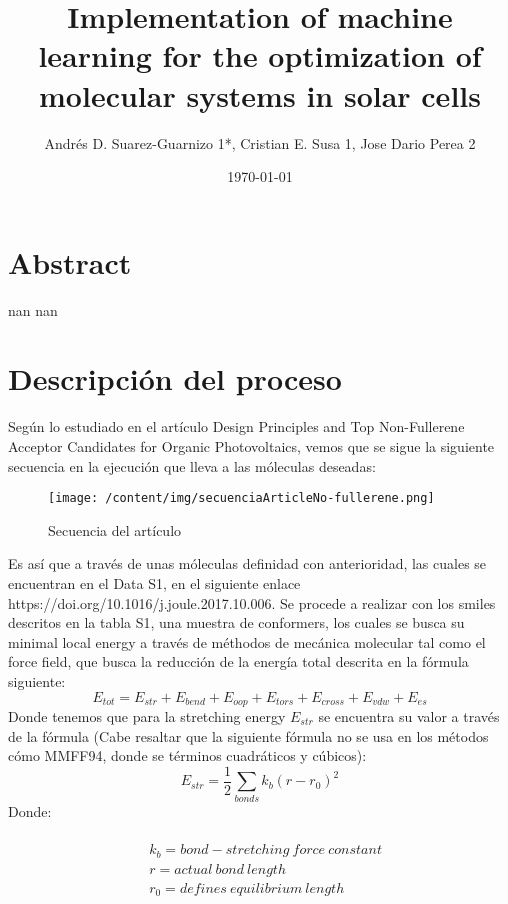 \documentclass{article}%
\title{Implementation of machine learning for the optimization of molecular systems in solar cells}%
\author{Andrés D. Suarez{-}Guarnizo 1*, Cristian E. Susa 1, Jose Dario Perea 2}%
\date{\today}%
\begin{document}
%
\normalsize%
\maketitle%
\section{Abstract}%
\label{sec:Abstract}%
nan%
nan

%
\section{Descripción del proceso}%
\label{sec:Descripcindelproceso}%
Según lo estudiado en el artículo Design Principles and Top Non{-}Fullerene Acceptor Candidates for Organic Photovoltaics, vemos que se sigue la siguiente secuencia en la ejecución que lleva a las móleculas deseadas:%


\begin{figure}[h!]%
\centering%
\texttt{[image: /content/img/secuenciaArticleNo-fullerene.png]}%
\caption{Secuencia del artículo}%
\end{figure}

%
Es así que a través de unas móleculas definidad con anterioridad, las cuales se encuentran en el Data S1, en el siguiente enlace https://doi.org/10.1016/j.joule.2017.10.006. Se procede a realizar con los smiles descritos en la tabla S1, una muestra de conformers, los cuales se busca su minimal local energy a través de méthodos de mecánica molecular tal como el force field, que busca la reducción de la energía total descrita en la fórmula siguiente:%
\begin{equation}
    E_{tot} = E_{str} + E_{bend} + E_{oop} + E_{tors} + E_{cross} + E_{vdw} + E_{es} 
\end{equation}%
Donde tenemos que para la stretching energy $E_{str}$ se encuentra su valor a través de la fórmula (Cabe resaltar que la siguiente fórmula no se usa en los métodos cómo MMFF94, donde se términos cuadráticos y cúbicos):%
\begin{equation}
    E_{str} = \frac{1}{2} \sum_{bonds} k_b(r-r_0)^2%
\end{equation}%
Donde:
\begin{fleqn}
\begin{equation*}
\begin{alignedat}{2}
\\ &k_b = bond-stretching \ force \ constant \\  
&r = actual\ bond\ length \\ 
&r_0 = defines\ equilibrium\ length\\
\end{alignedat}
\end{equation*}
\end{fleqn}%
\end{document}
